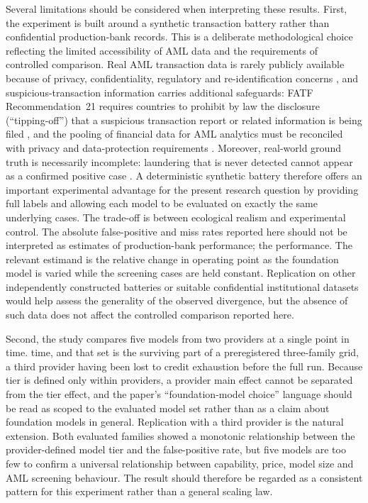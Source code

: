 \documentclass[pdflatex,sn-basic,Numbered]{sn-jnl}
\newcommand{\HLtext}[1]{\texthl{#1}}
\newcommand{\HLdel}[1]{\textcolor{HLink}{\sout{#1}}}
\renewcommand{\HLtext}[1]{#1}\renewcommand{\HLdel}[1]{#1}%
\begin{document}
Several limitations should be considered when interpreting these results. First, the experiment is built around a synthetic transaction battery rather than confidential production-bank records. This is a deliberate methodological choice reflecting the limited accessibility of AML data and the requirements of controlled comparison. Real AML transaction data is rarely publicly available because of privacy, confidentiality, regulatory and re-identification concerns \cite{jensen}, and suspicious-transaction information carries additional safeguards: FATF Recommendation~21 requires countries to prohibit by law the disclosure (``tipping-off'') that a suspicious transaction report or related information is being filed \cite{fatf-recs}, and the pooling of financial data for AML analytics must be reconciled with privacy and data-protection requirements \cite{fatf-datapooling}. Moreover, real-world ground truth is necessarily incomplete: laundering that is never detected cannot appear as a confirmed positive case \cite{altman}. A deterministic synthetic battery therefore offers an important experimental advantage for the present research question by providing full labels and allowing each model to be evaluated on exactly the same underlying cases. The trade-off is between ecological realism and experimental control. The absolute false-positive and miss rates reported here should not be interpreted as estimates of production-bank \HLdel{performance; the} \HLtext{performance. The} relevant estimand is the relative change in operating point as the foundation model is varied while the screening cases are held constant. Replication on other independently constructed batteries or suitable confidential institutional datasets would help assess the generality of the observed divergence, but the absence of such data does not affect the controlled comparison reported here.

Second, the study compares five models from two providers at a single point in \HLdel{time.} \HLtext{time, and that set is the surviving part of a preregistered three-family grid, a third provider having been lost to credit exhaustion before the full run. Because tier is defined only within providers, a provider main effect cannot be separated from the tier effect, and the paper's ``foundation-model choice'' language should be read as scoped to the evaluated model set rather than as a claim about foundation models in general. Replication with a third provider is the natural extension.} Both evaluated families showed a monotonic relationship between the provider-defined model tier and the false-positive rate, but five models are too few to confirm a universal relationship between capability, price, model size and AML screening behaviour. The result should therefore be regarded as a consistent pattern for this experiment rather than a general scaling law.
\end{document}
